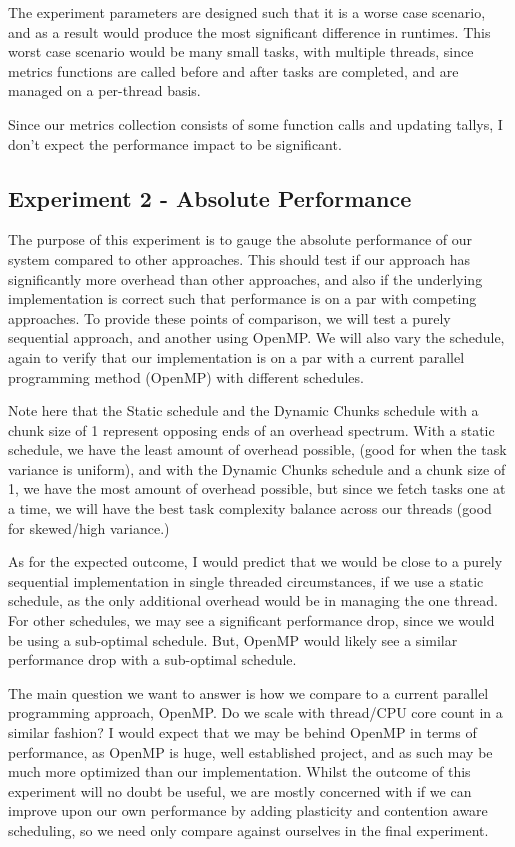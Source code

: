 The experiment parameters are designed such that it is a worse case scenario, and as a result would produce the most significant difference in runtimes. This worst case scenario would be many small tasks, with multiple threads, since metrics functions are called before and after tasks are completed, and are managed on a per-thread basis.

Since our metrics collection consists of some function calls and updating tallys, I don't expect the performance impact to be significant. 





\subsection{Experiment 2 - Absolute Performance}

The purpose of this experiment is to gauge the absolute performance of our system compared to other approaches. This should test if our approach has significantly more overhead than other approaches, and also if the underlying implementation is correct such that performance is on a par with competing approaches. To provide these points of comparison, we will test a purely sequential approach, and another using OpenMP. We will also vary the schedule, again to verify that our implementation is on a par with a current parallel programming method (OpenMP) with different schedules.

Note here that the Static schedule and the Dynamic Chunks schedule with a chunk size of 1 represent opposing ends of an overhead spectrum. With a static schedule, we have the least amount of overhead possible, (good for when the task variance is uniform), and with the Dynamic Chunks schedule and a chunk size of 1, we have the most amount of overhead possible, but since we fetch tasks one at a time, we will have the best task complexity balance across our threads (good for skewed/high variance.)

As for the expected outcome, I would predict that we would be close to a purely sequential implementation in single threaded circumstances, if we use a static schedule, as the only additional overhead would be in managing the one thread. For other schedules, we may see a significant performance drop, since we would be using a sub-optimal schedule. But, OpenMP would likely see a similar performance drop with a sub-optimal schedule.

The main question we want to answer is how we compare to a current parallel programming approach, OpenMP. Do we scale with thread/CPU core count in a similar fashion? I would expect that we may be behind OpenMP in terms of performance, as OpenMP is huge, well established project, and as such may be much more optimized than our implementation. Whilst the outcome of this experiment will no doubt be useful, we are mostly concerned with if we can improve upon our own performance by adding plasticity and contention aware scheduling, so we need only compare against ourselves in the final experiment.

